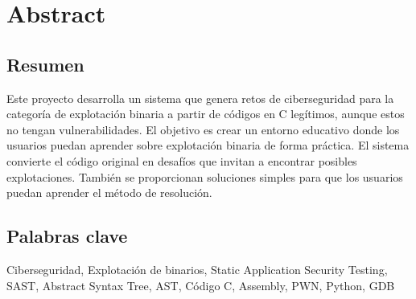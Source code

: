 \chapter*{Abstract}
\section*{Resumen}
Este proyecto desarrolla un sistema que genera
retos de ciberseguridad para la categoría de explotación binaria a partir de códigos en C
legítimos, aunque estos no tengan vulnerabilidades.
El objetivo es crear un entorno educativo donde los usuarios puedan aprender sobre explotación binaria de forma práctica.
El sistema convierte el código original en desafíos que invitan a encontrar posibles explotaciones. También se proporcionan soluciones simples para que los usuarios puedan aprender el método de resolución.

\section*{Palabras clave}
Ciberseguridad, Explotación de binarios, Static Application Security Testing, SAST, Abstract Syntax Tree, AST, Código C, Assembly, PWN, Python, GDB